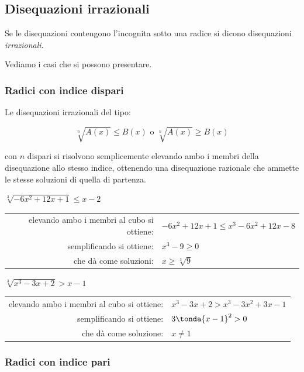 \subsection{Disequazioni irrazionali}
\label{sec:irvalass_irrazionali}

Se le disequazioni contengono l'incognita sotto una radice si dicono 
disequazioni \emph{irrazionali}.

Vediamo i casi che si possono presentare.

\subsubsection{Radici con indice dispari}

Le disequazioni irrazionali del tipo:

\[\sqrt[n]{A(x)} \leqslant B(x) \text{ o } \sqrt[n]{A(x)} \geqslant B(x)\]

con \(n\) dispari si risolvono semplicemente elevando ambo i membri della 
disequazione allo stesso indice, ottenendo una disequazione razionale che 
ammette le stesse soluzioni di quella di partenza.

\begin{esempio}
\(\sqrt[3]{-6x^2 +12x +1} \leqslant x -2\)
\begin{center} \begin{tabular}{rl}
elevando ambo i membri al cubo si ottiene: & 
\(-6x^2 +12x +1 \leqslant x^3 -6x^2 +12x -8\)\\
semplificando si ottiene: & \(x^3 -9 \geqslant 0\)\\
che dà come soluzioni: & \(x \geqslant \sqrt[3]{9}\)
\end{tabular} \end{center}
\end{esempio}

\begin{esempio}
\(\sqrt[3]{x^3 -3x +2} > x -1\)
\begin{center} \begin{tabular}{rl}
elevando ambo i membri al cubo si ottiene: & 
\(x^3 -3x +2 > x^3 -3x^2 +3x -1\)\\
semplificando si ottiene: & \(3 \tonda{x -1}^2 > 0\)\\
che dà come soluzione: & \( x \neq 1\) 
\end{tabular} \end{center} 
\end{esempio}

\subsubsection{Radici con indice pari}


